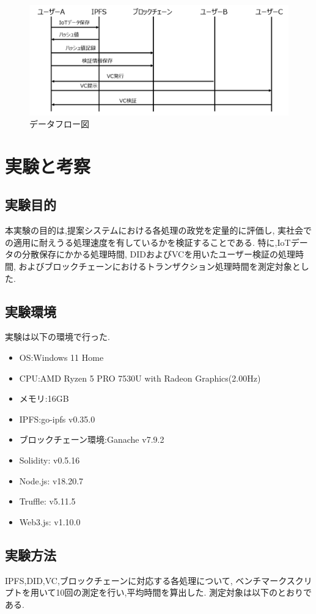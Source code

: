 \documentclass[a4paper,9pt,twocolumn]{ltjsarticle} %
\begin{document}
\begin{figure}[H]
  \centering
  \includegraphics[width=0.95\linewidth]{figure2.png}
  \caption{データフロー図}
  \label{fig:system-flow}
\end{figure}

\section{実験と考察}

\subsection{実験目的}
本実験の目的は,提案システムにおける各処理の政党を定量的に評価し,
実社会での適用に耐えうる処理速度を有しているかを検証することである.
特に,IoTデータの分散保存にかかる処理時間,
DIDおよびVCを用いたユーザー検証の処理時間,
およびブロックチェーンにおけるトランザクション処理時間を測定対象とした.

\subsection{実験環境}
実験は以下の環境で行った.
\begin{itemize}
  \item OS:Windows 11 Home
  \item CPU:AMD Ryzen 5 PRO 7530U with Radeon Graphics(2.00Hz)
  \item メモリ:16GB
  \item IPFS:go-ipfs v0.35.0
  \item ブロックチェーン環境:Ganache v7.9.2
  \item Solidity: v0.5.16
  \item Node.js: v18.20.7
  \item Truffle: v5.11.5
  \item Web3.js: v1.10.0
\end{itemize}

\subsection{実験方法}
IPFS,DID,VC,ブロックチェーンに対応する各処理について,
ベンチマークスクリプトを用いて10回の測定を行い,平均時間を算出した.
測定対象は以下のとおりである.
\end{document}
